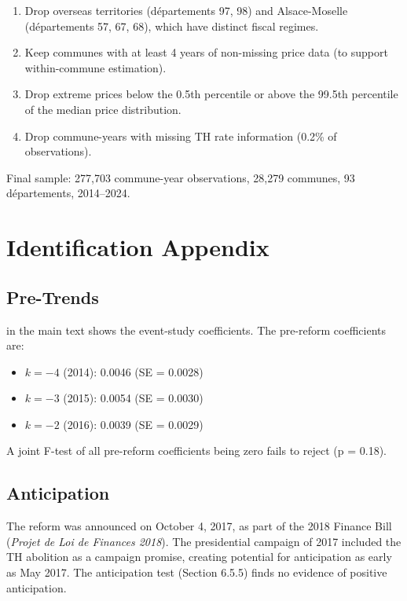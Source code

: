 \documentclass[12pt]{article}
\begin{document}
\begin{enumerate}
    \item Drop overseas territories (d\'{e}partements 97, 98) and Alsace-Moselle (d\'{e}partements 57, 67, 68), which have distinct fiscal regimes.
    \item Keep communes with at least 4 years of non-missing price data (to support within-commune estimation).
    \item Drop extreme prices below the 0.5th percentile or above the 99.5th percentile of the median price distribution.
    \item Drop commune-years with missing TH rate information (0.2\% of observations).
\end{enumerate}

Final sample: 277,703 commune-year observations, 28,279 communes, 93 d\'{e}partements, 2014--2024.


\section{Identification Appendix}
\label{app:identification}

\subsection{Pre-Trends}

 in the main text shows the event-study coefficients. The pre-reform coefficients are:

\begin{itemize}
    \item $k = -4$ (2014): 0.0046 (SE = 0.0028)
    \item $k = -3$ (2015): 0.0054 (SE = 0.0030)
    \item $k = -2$ (2016): 0.0039 (SE = 0.0029)
\end{itemize}

A joint F-test of all pre-reform coefficients being zero fails to reject (p = 0.18).

\subsection{Anticipation}

The reform was announced on October 4, 2017, as part of the 2018 Finance Bill (\emph{Projet de Loi de Finances 2018}). The presidential campaign of 2017 included the TH abolition as a campaign promise, creating potential for anticipation as early as May 2017. The anticipation test (Section 6.5.5) finds no evidence of positive anticipation.
\end{document}
